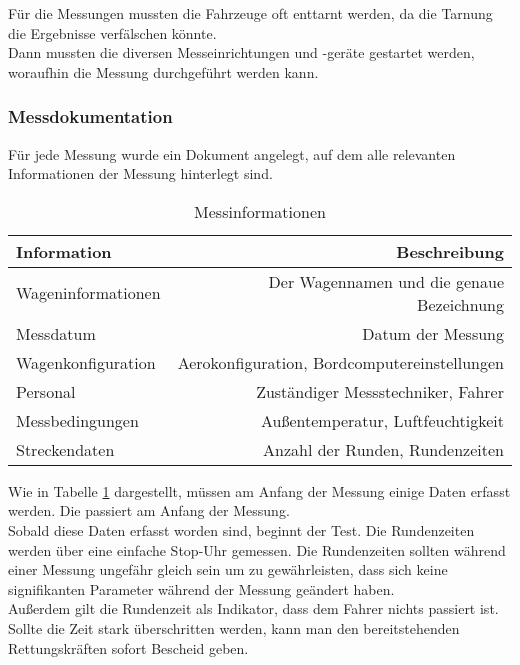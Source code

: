 Für die Messungen mussten die Fahrzeuge oft enttarnt werden, da die Tarnung die Ergebnisse verfälschen könnte.\\
Dann mussten die diversen Messeinrichtungen und -geräte gestartet werden, woraufhin die Messung durchgeführt werden kann. \\

\subsubsection{Messdokumentation}

Für jede Messung wurde ein Dokument angelegt, auf dem alle relevanten Informationen der Messung hinterlegt sind. 

\begin{table}[H]
	\begin{center}
		\begin{tabular}{l|r}
			\textbf{Information} & \textbf{Beschreibung}\\
			\hline
			Wageninformationen & Der Wagennamen und die genaue Bezeichnung\\
			Messdatum & Datum der Messung\\
			Wagenkonfiguration & Aerokonfiguration, Bordcomputereinstellungen\\
			Personal & Zuständiger Messstechniker, Fahrer\\
			Messbedingungen & Außentemperatur, Luftfeuchtigkeit\\
			Streckendaten & Anzahl der Runden, Rundenzeiten\\
		\end{tabular}
	
	\caption{Messinformationen}
	\label{MessTable}
	\end{center}
\end{table}

Wie in Tabelle \ref{MessTable} dargestellt, müssen am Anfang der Messung einige Daten erfasst werden. Die passiert am Anfang der Messung. \\
Sobald diese Daten erfasst worden sind, beginnt der Test. Die Rundenzeiten werden über eine einfache Stop-Uhr gemessen. Die Rundenzeiten sollten während einer Messung ungefähr gleich sein um zu gewährleisten, dass sich keine signifikanten Parameter während der Messung geändert haben. \\
Außerdem gilt die Rundenzeit als Indikator, dass dem Fahrer nichts passiert ist. Sollte die Zeit stark überschritten werden, kann man den bereitstehenden Rettungskräften sofort Bescheid geben.\\

